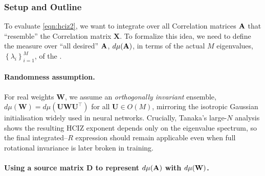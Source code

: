 \subsubsection{Setup and Outline}
\label{sxn:tanaka_setup}

\noindent
To evaluate \ref{eqn:hciz2},
we %
want to integrate over all \Student Correlation matrices $\mathbf{\mathbf{A}}$
that ``resemble'' the \Teacher Correlation matrix $\mathbf{X}$.  
To %
formalize this idea,
we need to %
define the measure over ``all desired'' $\mathbf{\mathbf{A}}$, $d\mu(\mathbf{\mathbf{A}})$, 
in 
terms of the actual $M$ eigenvalues, $\left\{ \lambda_{i} \right\}_{i=1}^{M}$, of the \Teacher.


\paragraph{Randomness assumption.}
For real weights $\mathbf{W}$,  we assume an \emph{orthogonally invariant} ensemble,
$d\mu(\mathbf W)=d\mu(\mathbf U\mathbf W\mathbf U^{\top})$ for all $\mathbf U\in O(M)$,
mirroring the isotropic Gaussian initialisation widely used in neural networks.
Crucially, Tanaka’s large-$N$ analysis shows the resulting HCIZ exponent depends only on the eigenvalue spectrum, so the final integrated–$R$ expression should remain applicable even when full rotational invariance is later broken in training.

\paragraph{Using a source matrix $\mathbf{D}$ to represent $d\mu(\mathbf{A})$ with $d\mu({\mathbf{W}})$.}

